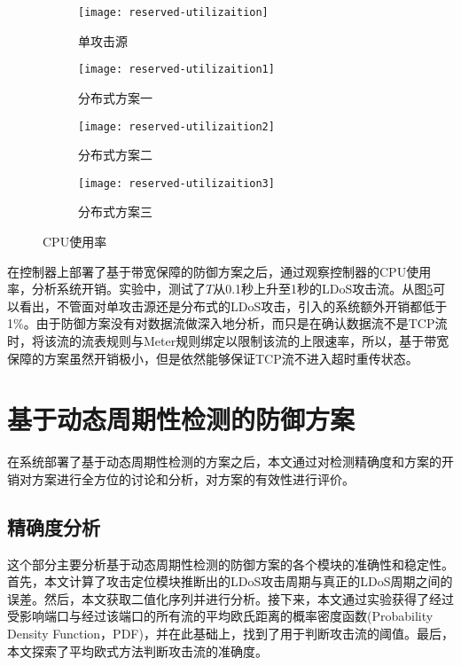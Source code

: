 \begin{figure}
    \begin{subfigure}{.49\textwidth}
        \centering
        \texttt{[image: reserved-utilizaition]}
        \caption{单攻击源}
        \label{fig:reserved-CPU-single}
    \end{subfigure}
    \begin{subfigure}{.49\textwidth}
        \centering
        \texttt{[image: reserved-utilizaition1]}
        \caption{分布式方案一}
        \label{fig:reserved-CPU-2h-mod1}
    \end{subfigure}

    \begin{subfigure}{.49\textwidth}
        \centering
        \texttt{[image: reserved-utilizaition2]}
        \caption{分布式方案二}
        \label{fig:reserved-CPU-2h-mod2}
    \end{subfigure}
    \begin{subfigure}{.49\textwidth}
        \centering
        \texttt{[image: reserved-utilizaition3]}
        \caption{分布式方案三}
        \label{fig:reserved-CPU-2h-mod3}
    \end{subfigure}


    \caption{CPU使用率}
    \label{fig:reserved-CPU-all}
\end{figure}


在控制器上部署了基于带宽保障的防御方案之后，通过观察控制器的CPU使用率，分析系统开销。实验中，测试了$T$从0.1秒上升至1秒的LDoS攻击流。从图\ref{fig:reserved-CPU-all}可以看出，不管面对单攻击源还是分布式的LDoS攻击，引入的系统额外开销都低于1\%。由于防御方案没有对数据流做深入地分析，而只是在确认数据流不是TCP流时，将该流的流表规则与Meter规则绑定以限制该流的上限速率，所以，基于带宽保障的方案虽然开销极小，但是依然能够保证TCP流不进入超时重传状态。




\section{基于动态周期性检测的防御方案}
\label{chap5:exp-period-detection}
在系统部署了基于动态周期性检测的方案之后，本文通过对检测精确度和方案的开销对方案进行全方位的讨论和分析，对方案的有效性进行评价。

\subsection{精确度分析}
\label{chap5:accuracy}
这个部分主要分析基于动态周期性检测的防御方案的各个模块的准确性和稳定性。首先，本文计算了攻击定位模块推断出的LDoS攻击周期与真正的LDoS周期之间的误差。然后，本文获取二值化序列并进行分析。接下来，本文通过实验获得了经过受影响端口与经过该端口的所有流的平均欧氏距离的概率密度函数(Probability Density Function，PDF)，并在此基础上，找到了用于判断攻击流的阈值。最后，本文探索了平均欧式方法判断攻击流的准确度。

